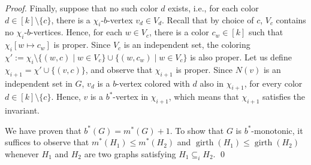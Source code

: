 \documentclass[10pt,a4paper]{amsart}
\DeclareMathOperator{\girth}{girth}
\newcommand{\sep}{\;|\;}
\newcommand{\seq}{\subseteq}
\begin{document}
\begin{proof}
Finally, suppose that no such color $d$ exists, i.e., for each color $d \in [k] \setminus \{c\}$, there is a $\chi_i$-$b$-vertex $v_d \in V_d$.
Recall that by choice of $c$, $V_c$ contains no $\chi_i$-$b$-vertices.
Hence, for each $w \in V_c$, there is a color $c_w \in [k]$ such that $\chi_i[w \mapsto c_w]$ is proper.
Since $V_c$ is an independent set, the coloring $\chi' := \chi_i \setminus \{(w, c) \sep w \in V_c\} \cup \{(w, c_w) \sep w \in V_c\}$ is also proper.
Let us define $\chi_{i+1} = \chi' \cup \{(v, c)\}$, and observe that $\chi_{i+1}$ is proper.
Since $N(v)$ is an independent set in $G$, $v_d$ is a $b$-vertex colored with $d$ also in $\chi_{i+1}$, for every color $d \in [k] \setminus \{c\}$.
Hence, $v$ is a $b^*$-vertex in $\chi_{i+1}$, which means that $\chi_{i+1}$ satisfies the invariant.

We have proven that $b^*(G) = m^*(G) + 1$.
To show that $G$ is $b^*$-monotonic, it suffices to observe that $m^*(H_1) \le m^*(H_2)$ and $\girth(H_1) \le \girth(H_2)$ whenever $H_1$ and $H_2$ are two graphs satisfying $H_1 \seq_i H_2$.
\qed\end{proof}
\end{document}
